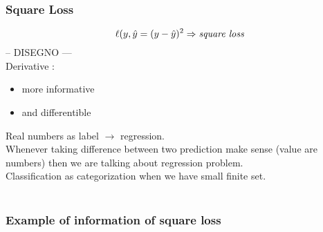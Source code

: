\subsubsection{Square Loss}
$$ \ell(y,\hat{y} = ( y - \hat{y} )^2  \Rightarrow \textit{square loss}\\$$
-- DISEGNO ---\\
Derivative :
\begin{itemize}
\item more informative
\item and differentible 
\end{itemize}
Real numbers as label $\rightarrow$ regression.\\
Whenever taking difference between two prediction make sense (value are numbers) then we are talking about regression problem.\\
Classification as categorization when we have small finite set.\\\\

\subsubsection{Example of information of square loss}

